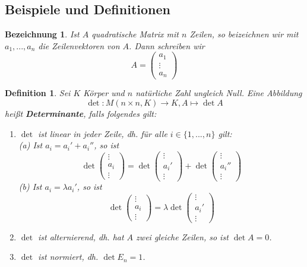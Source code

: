 \documentclass[12pt,a4paper]{article}
\theoremstyle{plain}
\newtheorem{Definition}[Theorem]{Definition}
\newtheorem{bez}[Theorem]{Bezeichnung}
\numberwithin{equation}{section}
\begin{document}
\subsection{Beispiele und Definitionen}
\begin{bez}
Ist $A$ quadratische Matrix mit $n$ Zeilen, so beizeichnen wir mit $a_1,...,a_n$ die Zeilenvektoren von $A$. Dann schreiben wir
\[A=\begin{pmatrix} a_1\\\vdots\\a_n\end{pmatrix}\]
\end{bez}
\begin{Definition}
Sei $K$ Körper und $n$ natürliche Zahl ungleich Null. Eine Abbildung
\[\operatorname{det}\colon M(n\times n,K)\rightarrow K, A\mapsto \operatorname{det} A\]
heißt \textbf{Determinante}, falls folgendes gilt:
\begin{enumerate}
\item $\operatorname{det}$ ist \textsl{linear} in jeder Zeile, dh. für alle $i\in\{1,...,n\}$ gilt:\\
(a) Ist $a_i=a_i'+a_i''$, so ist
\[\operatorname{det}\begin{pmatrix} \vdots\\ a_i\\\vdots\end{pmatrix}=\operatorname{det}\begin{pmatrix} \vdots\\ a_i'\\\vdots\end{pmatrix}+\operatorname{det}\begin{pmatrix} \vdots\\ a_i''\\\vdots\end{pmatrix}\]
(b) Ist $a_i=\lambda a_i'$, so ist
\[\operatorname{det}\begin{pmatrix} \vdots\\ a_i\\\vdots\end{pmatrix}=\lambda\operatorname{det}\begin{pmatrix} \vdots\\ a_i'\\\vdots\end{pmatrix}\]
\item $\operatorname{det}$ ist \textsl{alternierend}, dh. hat $A$ zwei gleiche Zeilen, so ist $\operatorname{det} A=0$.
\item $\operatorname{det}$ ist \textsl{normiert}, dh. $\operatorname{det} E_n=1$.
\end{enumerate}
\end{Definition}
\end{document}
